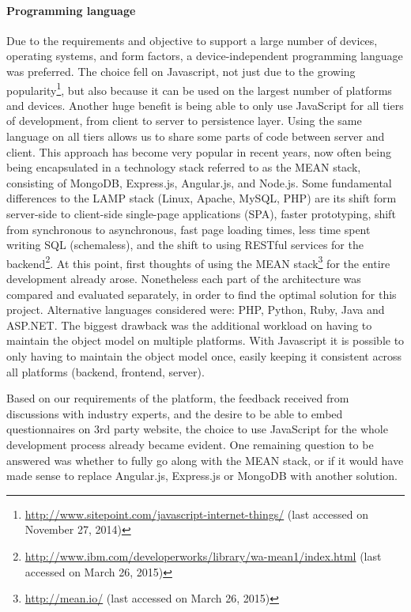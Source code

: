 	\paragraph{Programming language}

		Due to the requirements and objective to support a large number of devices, operating systems, and form factors, a device-independent programming language was preferred. 
		The choice fell on Javascript, not just due to the growing popularity\footnote{\url{http://www.sitepoint.com/javascript-internet-things/} (last accessed on November 27, 2014)}, but also because it can be used on the largest number of platforms and devices. Another huge benefit is being able to only use JavaScript for all tiers of development, from client to server to persistence layer. Using the same language on all tiers allows us to share some parts of code between server and client. This approach has become very popular in recent years, now often being being encapsulated in a technology stack referred to as the MEAN stack, consisting of MongoDB, Express.js, Angular.js, and Node.js. Some fundamental differences to the LAMP stack (Linux, Apache, MySQL, PHP) are its shift form server-side to client-side single-page applications (SPA), faster prototyping, shift from synchronous to asynchronous, fast page loading times, less time spent writing SQL (schemaless), and the shift to using RESTful services for the backend\footnote{\url{http://www.ibm.com/developerworks/library/wa-mean1/index.html} (last accessed on March 26, 2015)}. At this point, first thoughts of using the MEAN stack\footnote{\url{http://mean.io/} (last accessed on March 26, 2015)} for the entire development already arose. Nonetheless each part of the architecture was compared and evaluated separately, in order to find the optimal solution for this project.
		Alternative languages considered were: PHP, Python, Ruby, Java and ASP.NET. The biggest drawback was the additional workload on having to maintain the object model on multiple platforms. With Javascript it is possible to only having to maintain the object model once, easily keeping it consistent across all platforms (backend, frontend, server).

		Based on our requirements of the platform, the feedback received from discussions with industry experts, and the desire to be able to embed questionnaires on 3rd party website, the choice to use JavaScript for the whole development process already became evident. One remaining question to be answered was whether to fully go along with the MEAN stack, or if it would have made sense to replace Angular.js, Express.js or MongoDB with another solution.


